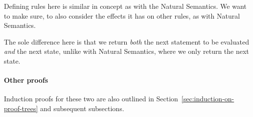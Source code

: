 Defining rules here is similar in concept as with the Natural Semantics.
We want to make sure, to also consider the effects it has on other rules, as with Natural Semantics.

The sole difference here is that we return \textit{both} the next statement to be evaluated \textit{and} the next state,
unlike with Natural Semantics, where we only return the next state.


\paragraph{Other proofs}
Induction proofs for these two are also outlined in Section~\ref{sec:induction-on-proof-trees} and subsequent subsections.
